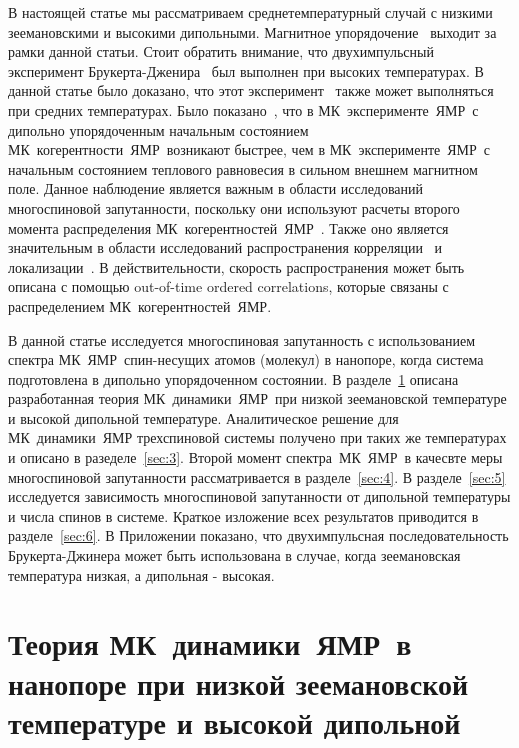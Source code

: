 \documentclass[utf8]{jetp}
\begin{document}
В настоящей статье мы рассматриваем среднетемпературный случай с низкими зеемановскими и высокими дипольными.
Магнитное упорядочение~\cite{Abragam_1982} выходит за рамки данной статьи.
Стоит обратить внимание, что двухимпульсный эксперимент Брукерта-Дженира~\cite{Jeener_1967} был выполнен при высоких температурах.
В данной статье было доказано, что этот эксперимент~\cite{Jeener_1967} также может выполняться при средних температурах.
Было показано~\cite{Doronin_2011}, что в МК~эксперименте~ЯМР~с дипольно упорядоченным начальным состоянием МК~когерентности~ЯМР~возникают быстрее,
чем в МК~эксперименте~ЯМР~с начальным состоянием теплового равновесия в сильном внешнем магнитном поле.
Данное наблюдение является важным в области исследований многоспиновой запутанности, поскольку они используют расчеты второго момента распределения МК~когерентностей~ЯМР~.
Также оно является значительным в области исследований распространения корреляции~\cite{Baugh_2001,Baum_1986,S_nchez_2014,Munowitz_1987} и локализации~\cite{Alvarez_2015,Wei_2018}.
В действительности, скорость распространения может быть описана с помощью out-of-time ordered correlations, которые связаны с распределением МК~когерентностей~ЯМР.

В данной статье исследуется многоспиновая запутанность с использованием спектра МК~ЯМР~спин-несущих атомов (молекул) в нанопоре, когда система подготовлена в дипольно упорядоченном состоянии.
В разделе~\ref{sec:2} описана разработанная теория МК~динамики~ЯМР~при низкой зеемановской температуре и высокой дипольной температуре.
Аналитическое решение для МК~динамики~ЯМР трехспиновой системы получено при таких же температурах и описано в разеделе~\ref{sec:3}.
Второй момент спектра~МК~ЯМР~в качесвте меры многоспиновой запутанности рассматривается в разделе~\ref{sec:4}.
В разделе~\ref{sec:5} исследуется зависимость многоспиновой запутанности от дипольной температуры и числа спинов в системе.
Краткое изложение всех результатов приводится в разделе~\ref{sec:6}.
В Приложении показано, что двухимпульсная последовательность Брукерта-Джинера может быть использована в случае, когда зеемановская температура низкая, а дипольная - высокая.



\section{Теория МК~динамики~ЯМР~в нанопоре при низкой зеемановской температуре и высокой дипольной}
\label{sec:2}
\end{document}
